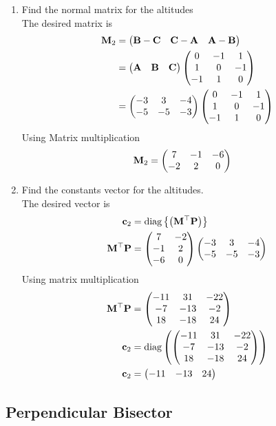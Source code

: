 \documentclass[11pt]{book}
\begin{document}
  
\begin{enumerate}[label=\thesubsection.\arabic*.,ref=\thesubsection.\theenumi]
\item Find the normal matrix for the altitudes \\
\solution  The desired matrix is 
\begin{align}
\mathbf{M}_2 &= \begin{pmatrix}\mathbf{B}-\mathbf{C} & \mathbf{C}-\mathbf{A} & \mathbf{A}-\mathbf{B} \end{pmatrix}
\\
&= 
\begin{pmatrix}\mathbf{A} & \mathbf{B} &\mathbf{C}\end{pmatrix}
\begin{pmatrix} 0 & -1 & 1 \\ 1 & 0 & -1 \\ -1 & 1 & 0\end{pmatrix} \\
&= 
\begin{pmatrix}-3 & 3 & -4 \\ -5 & -5 & -3\end{pmatrix}
\begin{pmatrix} 0 & -1 & 1 \\ 1 & 0 & -1 \\ -1 & 1 & 0\end{pmatrix}
\end{align}
Using Matrix multiplication 
\begin{align}
   \mathbf{M}_2 &=\begin{pmatrix}7 & -1 & -6 \\ -2 & 2 & 0\end{pmatrix}
\end{align}
\item Find the constants vector for the altitudes. \\
\solution The desired vector is 
\begin{align}
\mathbf{c}_2 &= \text{diag}\left\{\left(\mathbf{M}^{\top}\mathbf{P}\right)\right\} \\
\mathbf{M}^{\top}\mathbf{P} &= \begin{pmatrix}7&-2 \\ -1&2 \\ -6 &0\end{pmatrix}\begin{pmatrix}-3 & 3 & -4 \\ -5 & -5 & -3\end{pmatrix} \\
\end{align}
Using matrix multiplication
\begin{align}
 \mathbf{M}^{\top}\mathbf{P}    &=\begin{pmatrix} -11 & 31 & -22 \\ -7 & -13 & -2 \\ 18 & -18 & 24 \end{pmatrix} \\
    \mathbf{c}_2 &= \text{diag}\left( \begin{pmatrix} -11 & 31 & -22 \\ -7 & -13 & -2 \\ 18 & -18 & 24 \end{pmatrix} \right) \\
 \mathbf{c}_2   &= \begin{pmatrix} -11 & -13 & 24\end{pmatrix}
\end{align}
\end{enumerate}


\subsection{Perpendicular Bisector}
\end{document}
